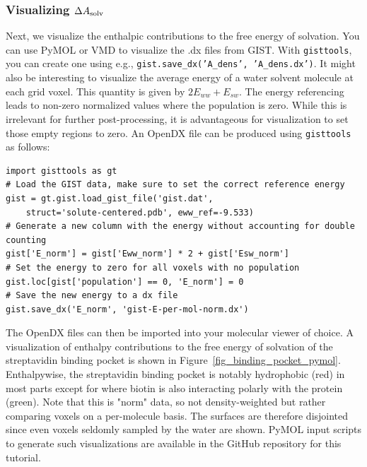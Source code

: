 \documentclass[9pt,tutorial]{livecoms}
\newcommand{\dasolv}{\Delta A_\textup{solv}}
\newcommand{\software}{\texttt}
\newcommand\inlinecode{\texttt}
\begin{document}
\subsubsection{Visualizing $\dasolv$}
Next, we visualize the enthalpic contributions to the free energy of solvation.
You can use PyMOL\cite{pymol} or VMD\cite{vmd} to visualize the .dx files from GIST\@.
With \software{gisttools}, you can create one using e.g., \inlinecode{gist.save\_dx('A\_dens', 'A\_dens.dx')}.
It might also be interesting to visualize the average energy of a water solvent molecule at each grid voxel.
This quantity is given by $2E_{ww} + E_{sw}$.
The energy referencing leads to non-zero normalized values where the population is zero.
While this is irrelevant for further post-processing, it is advantageous for visualization to set those empty regions to zero.
An OpenDX file can be produced using \software{gisttools} as follows:

\begin{lstlisting}[style=python]
import gisttools as gt
# Load the GIST data, make sure to set the correct reference energy
gist = gt.gist.load_gist_file('gist.dat',
    struct='solute-centered.pdb', eww_ref=-9.533)
# Generate a new column with the energy without accounting for double counting
gist['E_norm'] = gist['Eww_norm'] * 2 + gist['Esw_norm']
# Set the energy to zero for all voxels with no population
gist.loc[gist['population'] == 0, 'E_norm'] = 0
# Save the new energy to a dx file
gist.save_dx('E_norm', 'gist-E-per-mol-norm.dx')
\end{lstlisting}
The OpenDX files can then be imported into your molecular viewer of choice.
A visualization of enthalpy contributions to the free energy of solvation of the streptavidin binding pocket is shown in Figure~\ref{fig_binding_pocket_pymol}. 
Enthalpywise, the streptavidin binding pocket is notably hydrophobic (red) in most parts except for where biotin is also interacting polarly with the protein (green).
Note that this is "norm" data, so not density-weighted but rather comparing voxels on a per-molecule basis.
The surfaces are therefore disjointed since even voxels seldomly sampled by the water are shown.
PyMOL input scripts to generate such visualizations are available in the GitHub repository for this tutorial.
\end{document}
